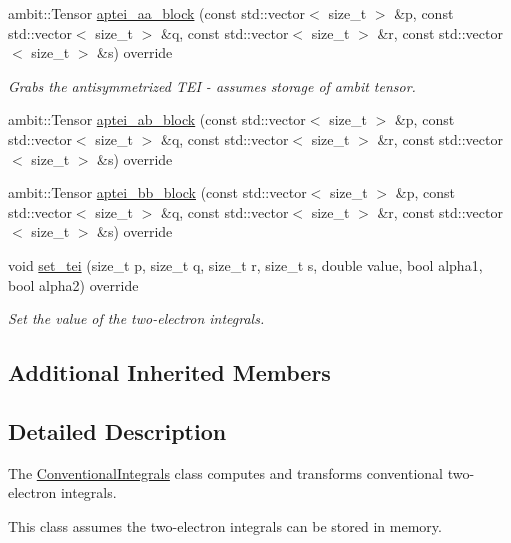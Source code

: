 \begin{DoxyCompactItemize}
ambit\+::\+Tensor \mbox{\hyperlink{classforte_1_1_conventional_integrals_abbe1dfb244b776a9d50fb2a06a837cbf}{aptei\+\_\+aa\+\_\+block}} (const std\+::vector$<$ size\+\_\+t $>$ \&p, const std\+::vector$<$ size\+\_\+t $>$ \&q, const std\+::vector$<$ size\+\_\+t $>$ \&r, const std\+::vector$<$ size\+\_\+t $>$ \&s) override
\begin{DoxyCompactList}\small\item\em Grabs the antisymmetrized T\+EI -\/ assumes storage of ambit tensor. \end{DoxyCompactList}\item 
ambit\+::\+Tensor \mbox{\hyperlink{classforte_1_1_conventional_integrals_aeb46dfc0030e582c301b64a011e2af58}{aptei\+\_\+ab\+\_\+block}} (const std\+::vector$<$ size\+\_\+t $>$ \&p, const std\+::vector$<$ size\+\_\+t $>$ \&q, const std\+::vector$<$ size\+\_\+t $>$ \&r, const std\+::vector$<$ size\+\_\+t $>$ \&s) override
\item 
ambit\+::\+Tensor \mbox{\hyperlink{classforte_1_1_conventional_integrals_a85a995f80f256953f9ceeb2ea903cf0b}{aptei\+\_\+bb\+\_\+block}} (const std\+::vector$<$ size\+\_\+t $>$ \&p, const std\+::vector$<$ size\+\_\+t $>$ \&q, const std\+::vector$<$ size\+\_\+t $>$ \&r, const std\+::vector$<$ size\+\_\+t $>$ \&s) override
\item 
void \mbox{\hyperlink{classforte_1_1_conventional_integrals_aef0130cb53212f32652a56e83e204519}{set\+\_\+tei}} (size\+\_\+t p, size\+\_\+t q, size\+\_\+t r, size\+\_\+t s, double value, bool alpha1, bool alpha2) override
\begin{DoxyCompactList}\small\item\em Set the value of the two-\/electron integrals. \end{DoxyCompactList}\end{DoxyCompactItemize}
\subsection*{Additional Inherited Members}


\subsection{Detailed Description}
The \mbox{\hyperlink{classforte_1_1_conventional_integrals}{Conventional\+Integrals}} class computes and transforms conventional two-\/electron integrals. 

This class assumes the two-\/electron integrals can be stored in memory. 

